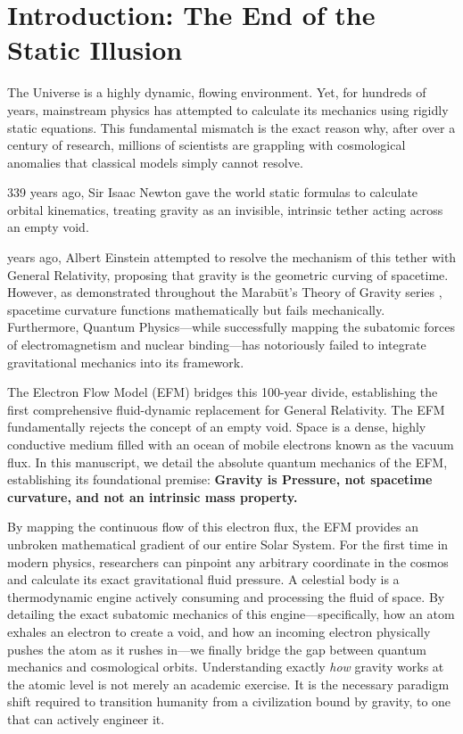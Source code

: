 \documentclass[11pt, a4paper]{article}
\begin{document}
\section{Introduction: The End of the Static Illusion}

The Universe is a highly dynamic, flowing environment. Yet, for hundreds of years, mainstream physics has attempted to calculate its mechanics using rigidly static equations. This fundamental mismatch is the exact reason why, after over a century of research, millions of scientists are grappling with cosmological anomalies that classical models simply cannot resolve. 

339 years ago, Sir Isaac Newton gave the world static formulas to calculate orbital kinematics, treating gravity as an invisible, intrinsic tether acting across an empty void.

 years ago, Albert Einstein attempted to resolve the mechanism of this tether with General Relativity, proposing that gravity is the geometric curving of spacetime. However, as demonstrated throughout the Marab\={u}t's Theory of Gravity series \cite{marabut2026m1, marabut2026m2, marabut2026m3, marabut2026m4}, spacetime curvature functions mathematically but fails mechanically. Furthermore, Quantum Physics---while successfully mapping the subatomic forces of electromagnetism and nuclear binding---has notoriously failed to integrate gravitational mechanics into its framework.

The Electron Flow Model (EFM) bridges this 100-year divide, establishing the first comprehensive fluid-dynamic replacement for General Relativity. The EFM fundamentally rejects the concept of an empty void. Space is a dense, highly conductive medium filled with an ocean of mobile electrons known as the vacuum flux. In this manuscript, we detail the absolute quantum mechanics of the EFM, establishing its foundational premise: \textbf{Gravity is Pressure, not spacetime curvature, and not an intrinsic mass property.} 

By mapping the continuous flow of this electron flux, the EFM provides an unbroken mathematical gradient of our entire Solar System. For the first time in modern physics, researchers can pinpoint any arbitrary coordinate in the cosmos and calculate its exact gravitational fluid pressure. A celestial body is a thermodynamic engine actively consuming and processing the fluid of space. By detailing the exact subatomic mechanics of this engine---specifically, how an atom exhales an electron to create a void, and how an incoming electron physically pushes the atom as it rushes in---we finally bridge the gap between quantum mechanics and cosmological orbits. Understanding exactly \textit{how} gravity works at the atomic level is not merely an academic exercise. It is the necessary paradigm shift required to transition humanity from a civilization bound by gravity, to one that can actively engineer it.
\end{document}
